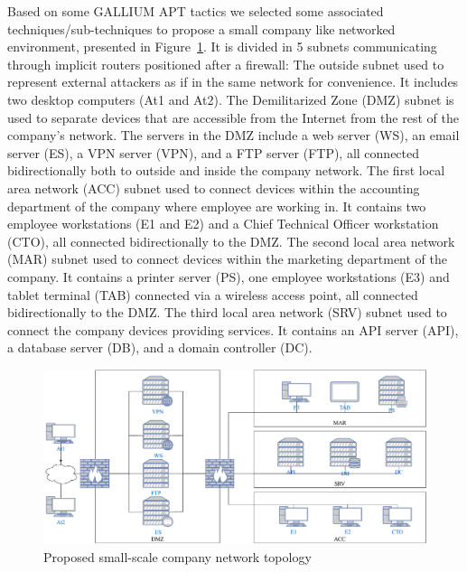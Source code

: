 \documentclass[conference]{IEEEtran}
\begin{document}
\noindent
Based on some GALLIUM APT tactics we selected some associated techniques/sub-techniques to propose a small company like networked environment, presented in Figure~\ref{fig:scenario_network_topology}. It is divided in 5 subnets communicating through implicit routers positioned after a firewall:
The outside subnet used to represent external attackers as if in the same network for convenience. It includes two desktop computers (At1 and At2).
The Demilitarized Zone (DMZ) subnet is used to separate devices that are accessible from the Internet from the rest of the company's network. The servers in the DMZ include a web server (WS), an email server (ES), a VPN server (VPN), and a FTP server (FTP), all connected bidirectionally both to outside and inside the company network.
The first local area network (ACC) subnet used to connect devices within the accounting department of the company where employee are working in. It contains two employee workstations (E1 and E2) and a Chief Technical Officer workstation (CTO), all connected bidirectionally to the DMZ. %
The second local area network (MAR) subnet used to connect devices within the marketing department of the company. It contains a printer server (PS), one employee workstations (E3) and tablet terminal (TAB) connected via a wireless access point, all connected bidirectionally to the DMZ. %
The third local area network (SRV) subnet used to connect the company devices providing services. It contains an API server (API), a database server (DB), and a domain controller (DC).

\begin{figure}
    \centering
    \includegraphics[width=\linewidth]{figures/topology.pdf}
    \caption{Proposed small-scale company network topology}
    \label{fig:scenario_network_topology}
\end{figure}
\end{document}
